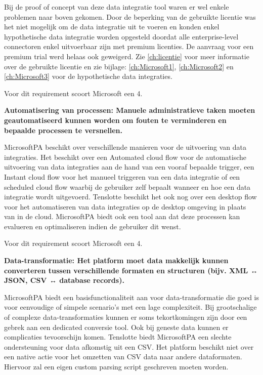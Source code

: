 Bij de proof of concept van deze data integratie tool waren er wel enkele problemen naar boven gekomen. Door de beperking van de gebruikte licentie was het niet mogelijk om de data integratie uit te voeren en konden enkel hypothetische data integratie worden opgesteld doordat alle enterprise-level connectoren enkel uitvoerbaar zijn met premium licenties. De aanvraag voor een premium trial werd helaas ook geweigerd. Zie \ref{ch:licentie} voor meer informatie over de gebruikte licentie en zie bijlage: \ref{ch:Microsoft1}, \ref{ch:Microsoft2} en \ref{ch:Microsoft3} voor de hypothetische data integraties.

Voor dit requirement scoort Microsoft een 4.

\vspace{\baselineskip}

\textbf{Automatisering van processen: Manuele administratieve taken moeten geautomatiseerd kunnen worden om fouten te verminderen en bepaalde processen te versnellen.}

\vspace{\baselineskip}

MicrosoftPA beschikt over verschillende manieren voor de uitvoering van data integraties. Het beschikt over een Automated cloud flow voor de automatische uitvoering van data integraties aan de hand van een vooraf bepaalde trigger, een Instant cloud flow voor het manueel triggeren van een data integratie of een scheduled cloud flow waarbij de gebruiker zelf bepaalt wanneer en hoe een data integratie wordt uitgevoerd. Tenslotte beschikt het ook nog over een desktop flow voor het automatiseren van data integraties op de desktop omgeving in plaats van in de cloud. MicrosoftPA biedt ook een tool aan dat deze processen kan evalueren en optimaliseren indien de gebruiker dit wenst.


Voor dit requirement scoort Microsoft een 4.

\vspace{\baselineskip}
\textbf{Data-transformatie: Het platform moet data makkelijk kunnen converteren tussen verschillende formaten en structuren (bijv. XML ↔ JSON, CSV ↔ database records).}

\vspace{\baselineskip}

MicrosoftPA biedt een basisfunctionaliteit aan voor data-transformatie die goed is voor eenvoudige of simpele scenario’s met een lage complexiteit. Bij grootschalige of complexe data-transformaties kunnen er soms tekortkomingen zijn door een gebrek aan een dedicated conversie tool. Ook bij geneste data kunnen er complicaties tevoorschijn komen. Tenslotte biedt MicrosoftPA een slechte ondersteuning voor data afkomstig uit een CSV. Het platform beschikt niet over een native actie voor het omzetten van CSV data naar andere dataformaten. Hiervoor zal een eigen custom parsing script geschreven moeten worden.

